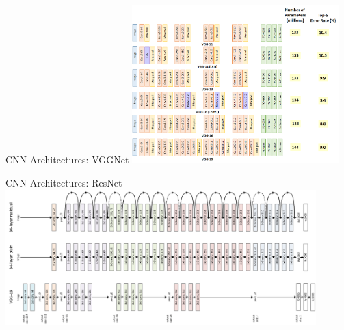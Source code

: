 \begin{frame}{CNN Architectures: VGGNet}
	\centering
	\includegraphics[width=0.6\textwidth]{../Images/CNNArchitectures/VGGNet.png}\\
\end{frame}

\begin{frame}{CNN Architectures: ResNet}
	\centering
	\includegraphics[width=0.9\textwidth]{../Images/CNNArchitectures/ResNet.png}\\
\end{frame}
